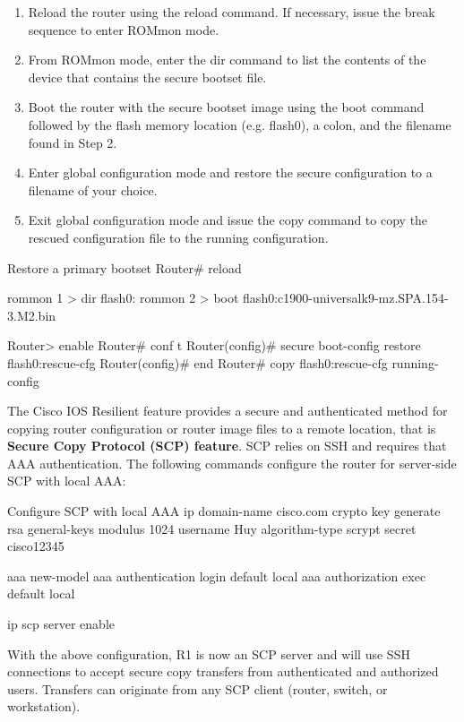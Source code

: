 \begin{enumerate}
\item Reload the router using the reload command. If necessary, issue the break sequence to enter ROMmon mode.
\item From ROMmon mode, enter the dir command to list the contents of the device that contains the secure bootset file.
\item Boot the router with the secure bootset image using the boot command followed by the flash memory location (e.g. flash0), a colon, and the filename found in Step 2.
\item Enter global configuration mode and restore the secure configuration to a filename of your choice.
\item Exit global configuration mode and issue the copy command to copy the rescued configuration file to the running configuration.
\end{enumerate}

\begin{sexylisting}{Restore a primary bootset}
Router# reload

rommon 1 > dir flash0:
rommon 2 > boot flash0:c1900-universalk9-mz.SPA.154-3.M2.bin

Router> enable
Router# conf t
Router(config)# secure boot-config restore flash0:rescue-cfg
Router(config)# end
Router# copy flash0:rescue-cfg running-config
\end{sexylisting}

The Cisco IOS Resilient feature provides a  secure and authenticated method for copying router configuration or router image files to a remote location, that is \textbf{Secure Copy Protocol (SCP) feature}. SCP relies on SSH and requires that AAA authentication.  The following commands configure the router for server-side SCP with local AAA:

\begin{sexylisting}{Configure SCP with local AAA}
ip domain-name cisco.com
crypto key generate rsa general-keys modulus 1024
username Huy algorithm-type scrypt secret cisco12345

aaa new-model 
aaa authentication login default local 
aaa authorization exec default local

ip scp server enable
\end{sexylisting}

With the above configuration, R1 is now an SCP server and will use SSH connections to accept secure copy transfers from authenticated and authorized users. Transfers can originate from any SCP client (router, switch, or workstation). \\

